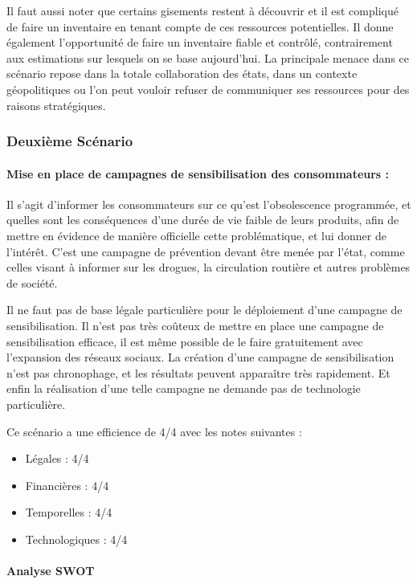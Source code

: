 Il faut aussi noter que certains gisements restent à découvrir et il est compliqué de faire un inventaire en tenant compte de ces ressources potentielles.
Il donne également l’opportunité de faire un inventaire fiable et contrôlé, contrairement aux estimations sur lesquels on se base aujourd’hui.
\medbreak
La principale menace dans ce scénario repose dans la totale collaboration des états, dans un contexte géopolitiques ou l’on peut vouloir refuser de communiquer ses ressources pour des raisons stratégiques.


\subsubsection{Deuxième Scénario}

\paragraph{Mise en place de campagnes de sensibilisation des consommateurs :}

\medbreak
Il s’agit d’informer les consommateurs sur ce qu’est l’obsolescence programmée, et quelles sont les conséquences d’une durée de vie faible de leurs produits, afin de mettre en évidence de manière officielle cette problématique, et lui donner de l'intérêt. C’est une campagne de prévention devant être menée par l’état, comme celles visant à informer sur les drogues, la circulation routière et autres problèmes de société.

\medbreak
Il ne faut pas de base légale particulière pour le déploiement d’une campagne de sensibilisation.
Il n’est pas très coûteux de mettre en place une campagne de sensibilisation efficace, il est même possible de le faire gratuitement avec l'expansion des réseaux sociaux.
La création d’une campagne de sensibilisation n’est pas chronophage, et les résultats peuvent apparaître très rapidement.
Et enfin la réalisation d’une telle campagne ne demande pas de technologie particulière.

Ce scénario a une efficience de 4/4 avec les notes suivantes :
\begin{itemize}
\item Légales : 4/4
\item Financières : 4/4
\item Temporelles : 4/4
\item Technologiques : 4/4
\end{itemize}

\paragraph{Analyse SWOT}

